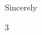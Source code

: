 \documentclass[letterpaper, 10pt, draft]{article}
\begin{document}

\blindtext

\blindtext

\closing{Sincerely}{3 \baselineskip}
\end{document}
